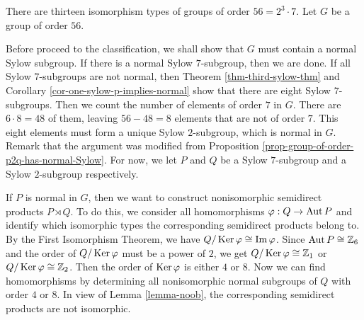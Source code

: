 \begin{example}
	There are thirteen isomorphism types of groups of order $56 = 2^3\cdot 7$. Let $G$ be a group of order $56$. 
	
	
Before proceed to the classification, we shall show that $G$ must contain a normal Sylow subgroup. If there is a normal Sylow $7$-subgroup, then we are done. If all Sylow $7$-subgroups are not normal, then Theorem \ref{thm-third-sylow-thm} and Corollary \ref{cor-one-sylow-p-implies-normal} show that there are eight Sylow $7$-subgroups. Then we count the number of elements of order $7$ in $G$. There  are $6\cdot 8  =48$ of them, leaving $56-48= 8$ elements that are not of order $7$. This eight elements must form a unique Sylow $2$-subgroup, which is normal in $G$. Remark that the argument was modified from Proposition \ref{prop-group-of-order-p2q-has-normal-Sylow}. For now, we let $P$ and $Q$ be a Sylow $7$-subgroup and a Sylow $2$-subgroup respectively. %
	
If  $P$ is normal in $G$, then we want to construct nonisomorphic semidirect products $P\rtimes Q$. To do this, we consider all homomorphisms $\varphi:Q\rightarrow \operatorname{Aut} P$ and identify which isomorphic types the corresponding semidirect products belong to. By the First Isomorphism Theorem, we have
	$
	Q/\operatorname{Ker}  \varphi \cong \operatorname{Im}  \varphi
	$.
	Since $\operatorname{Aut}  P\cong \mathbb{Z}_6$ and the order of $Q/\operatorname{Ker} \varphi$ must be a power of $2$, we get $Q/\operatorname{Ker} \varphi\cong \mathbb{Z}_1$ or $Q/\operatorname{Ker} \varphi\cong \mathbb{Z}_2$.  Then the order of $\operatorname{Ker} \varphi$ is either $4$ or $8$. Now we can find homomorphisms by determining all nonisomorphic normal subgroups of $Q$ with order $4$ or $8$. In view of Lemma \ref{lemma-noob}, the corresponding semidirect products are not isomorphic.
	

\end{example}
